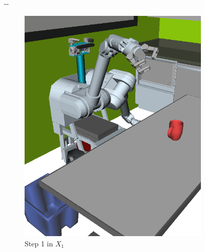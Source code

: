 \documentclass{report}
\newlength{\offsetpage}
\newenvironment{widepage}
   {\begin{adjustwidth}{-\offsetpage}{-\offsetpage}%
    \addtolength{\textwidth}{2\offsetpage}}%
{\end{adjustwidth}}
\begin{document}
{\begin{figure}
\begin{widepage}
\begin{center}
\begin{subfigure}[t]{0.19\linewidth}
\includegraphics[width=\columnwidth]{figs/testherb-b.png}
\caption{Step 1 in $X_1$}
\end{subfigure}
\begin{subfigure}[t]{0.19\linewidth}
\centering

\end{subfigure}
\end{center}
\end{widepage}
\end{figure}}
\end{document}

